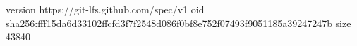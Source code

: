 version https://git-lfs.github.com/spec/v1
oid sha256:fff15da6d33102ffcfd3f7f2548d086f0bf8e752f07493f9051185a39247247b
size 43840
